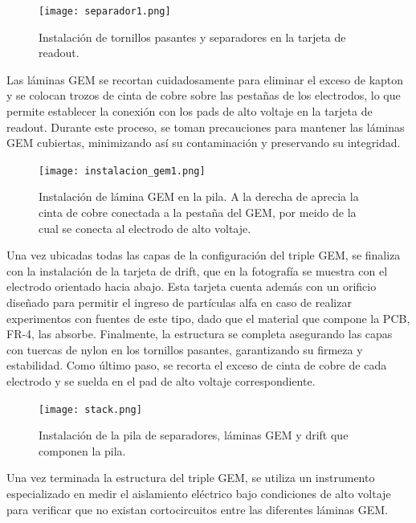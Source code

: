 \documentclass{article}
\begin{document}
\begin{figure}[H]
    \centering
    \texttt{[image: separador1.png]}
    \caption{Instalación de tornillos pasantes y separadores en la tarjeta de readout.}
    \label{fig:separador1}
\end{figure}

\noindent Las láminas GEM se recortan cuidadosamente para eliminar el exceso de kapton y se colocan trozos de cinta de cobre sobre las pestañas de los electrodos, lo que permite establecer la conexión con los pads de alto voltaje en la tarjeta de readout. Durante este proceso, se toman precauciones para mantener las láminas GEM cubiertas, minimizando así su contaminación y preservando su integridad.

\begin{figure}[H]
    \centering
    \texttt{[image: instalacion\_gem1.png]}
    \caption{Instalación de lámina GEM en la pila. A la derecha de aprecia la cinta de cobre conectada a la pestaña del GEM, por meido de la cual se conecta al electrodo de alto voltaje.}
    \label{fig:gem1}
\end{figure}

\noindent Una vez ubicadas todas las capas de la configuración del triple GEM, se finaliza con la instalación de la tarjeta de drift, que en la fotografía se muestra con el electrodo orientado hacia abajo. Esta tarjeta cuenta además con un orificio diseñado para permitir el ingreso de partículas alfa en caso de realizar experimentos con fuentes de este tipo, dado que el material que compone la PCB, FR-4, las absorbe. Finalmente, la estructura se completa asegurando las capas con tuercas de nylon en los tornillos pasantes, garantizando su firmeza y estabilidad. Como último paso, se recorta el exceso de cinta de cobre de cada electrodo y se suelda en el pad de alto voltaje correspondiente.

\begin{figure}[H]
    \centering
    \texttt{[image: stack.png]}
    \caption{Instalación de la pila de separadores, láminas GEM y drift que componen la pila.}
    \label{fig:stack}
\end{figure}

\noindent Una vez terminada la estructura del triple GEM, se utiliza un instrumento especializado en medir el aislamiento eléctrico bajo condiciones de alto voltaje para verificar que no existan cortocircuitos entre las diferentes láminas GEM.
\end{document}
